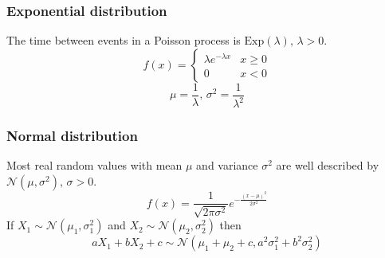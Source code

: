 \subsubsection{Exponential distribution}
The time between events in a Poisson process is $\textrm{Exp}(\lambda),\,\lambda>0$.
\[f(x) = \left\{
\begin{array}{cl}
\lambda e^{-\lambda x} & x\geq0\\
0 & x<0
\end{array}\right.\]
\[\mu=\frac{1}{\lambda},\,\sigma^2=\frac{1}{\lambda^2}\]

\subsubsection{Normal distribution}
Most real random values with mean $\mu$ and variance $\sigma^2$ are well described by $\mathcal{N}(\mu,\sigma^2),\,\sigma>0$.
\[ f(x) = \frac{1}{\sqrt{2\pi\sigma^2}}e^{-\frac{(x-\mu)^2}{2\sigma^2}} \]
If $X_1 \sim \mathcal{N}(\mu_1,\sigma_1^2)$ and $X_2 \sim \mathcal{N}(\mu_2,\sigma_2^2)$ then
\[ aX_1 + bX_2 + c \sim \mathcal{N}(\mu_1+\mu_2+c,a^2\sigma_1^2+b^2\sigma_2^2) \]


